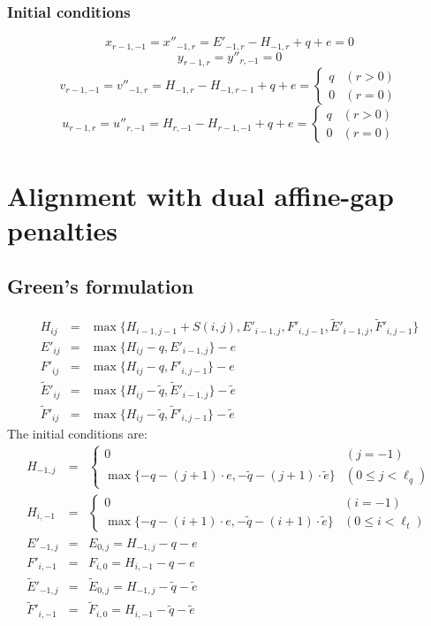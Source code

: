 \documentclass[10pt]{article}
\begin{document}
\subsubsection{Initial conditions}
\[x_{r-1,-1}=x''_{-1,r}=E'_{-1,r}-H_{-1,r}+q+e=0\]
\[y_{r-1,r}=y''_{r,-1}=0\]
\[v_{r-1,-1}=v''_{-1,r}=H_{-1,r}-H_{-1,r-1}+q+e=\left\{\begin{array}{ll}
  q & (r>0) \\
  0 & (r=0)
\end{array}\right.\]
\[u_{r-1,r}=u''_{r,-1}=H_{r,-1}-H_{r-1,-1}+q+e=\left\{\begin{array}{ll}
  q & (r>0) \\
  0 & (r=0)
\end{array}\right.\]

\section{Alignment with dual affine-gap penalties}

\subsection{Green's formulation}

\begin{eqnarray*}
H_{ij} &=& \max\{H_{i-1,j-1}+S(i,j),E'_{i-1,j},F'_{i,j-1},\tilde{E}'_{i-1,j},\tilde{F}'_{i,j-1}\}\\
E'_{ij}&=& \max\{H_{ij}-q,E'_{i-1,j}\}-e\\
F'_{ij}&=& \max\{H_{ij}-q,F'_{i,j-1}\}-e\\
\tilde{E}'_{ij}&=& \max\{H_{ij}-\tilde{q},\tilde{E}'_{i-1,j}\}-\tilde{e}\\
\tilde{F}'_{ij}&=& \max\{H_{ij}-\tilde{q},\tilde{F}'_{i,j-1}\}-\tilde{e}
\end{eqnarray*}
The initial conditions are:
\begin{eqnarray*}
H_{-1,j}&=&
  \left\{\begin{array}{ll}
    0 & (j=-1)\\
	\max\{-q-(j+1)\cdot e,-\tilde{q}-(j+1)\cdot\tilde{e}\} & (0\le j<\ell_q)
  \end{array}\right.\\
H_{i,-1}&=&
  \left\{\begin{array}{ll}
    0 & (i=-1)\\
	\max\{-q-(i+1)\cdot e,-\tilde{q}-(i+1)\cdot\tilde{e}\} & (0\le i<\ell_t)
  \end{array}\right.\\
E'_{-1,j}&=&E_{0,j}=H_{-1,j}-q-e\\
F'_{i,-1}&=&F_{i,0}=H_{i,-1}-q-e\\
\tilde{E}'_{-1,j}&=&\tilde{E}_{0,j}=H_{-1,j}-\tilde{q}-\tilde{e}\\
\tilde{F}'_{i,-1}&=&\tilde{F}_{i,0}=H_{i,-1}-\tilde{q}-\tilde{e}
\end{eqnarray*}
\end{document}
